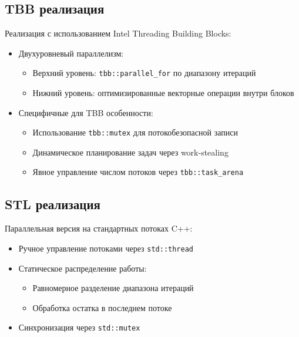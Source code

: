 \documentclass[12pt]{article}
\begin{document}
\subsection{TBB реализация}
Реализация с использованием Intel Threading Building Blocks:
\begin{itemize}
    \item Двухуровневый параллелизм:
    \begin{itemize}
        \item Верхний уровень: \texttt{tbb::parallel\_for} по диапазону итераций
        \item Нижний уровень: оптимизированные векторные операции внутри блоков
    \end{itemize}
    \item Специфичные для TBB особенности:
    \begin{itemize}
        \item Использование \texttt{tbb::mutex} для потокобезопасной записи
        \item Динамическое планирование задач через work-stealing
        \item Явное управление числом потоков через \texttt{tbb::task\_arena}
    \end{itemize}
\end{itemize}

\subsection{STL реализация}
Параллельная версия на стандартных потоках C++:
\begin{itemize}
    \item Ручное управление потоками через \texttt{std::thread}
    \item Статическое распределение работы:
    \begin{itemize}
        \item Равномерное разделение диапазона итераций
        \item Обработка остатка в последнем потоке
    \end{itemize}
    \item Синхронизация через \texttt{std::mutex}
\end{itemize}
\end{document}
